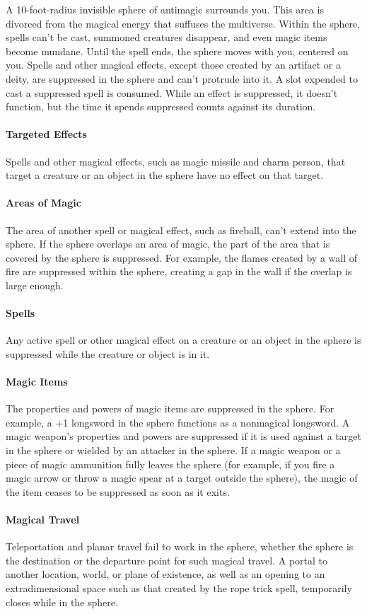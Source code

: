 \documentclass[12pt,showtrims]{memoir}
\begin{document}
\vspace{1\baselineskip}\noindent A 10-foot-radius invisible sphere of antimagic surrounds you. This area is divorced from the magical energy that suffuses the multiverse. Within the sphere, spells can't be cast, summoned creatures disappear, and even magic items become mundane. Until the spell ends, the sphere moves with you, centered on you. Spells and other magical effects, except those created by an artifact or a deity, are suppressed in the sphere and can't protrude into it. A slot expended to cast a suppressed spell is consumed. While an effect is suppressed, it doesn't function, but the time it spends suppressed counts against its duration. \paragraph{Targeted Effects} Spells and other magical effects, such as magic missile and charm person, that target a creature or an object in the sphere have no effect on that target. \paragraph{Areas of Magic} The area of another spell or magical effect, such as fireball, can't extend into the sphere. If the sphere overlaps an area of magic, the part of the area that is covered by the sphere is suppressed. For example, the flames created by a wall of fire are suppressed within the sphere, creating a gap in the wall if the overlap is large enough. \paragraph{Spells} Any active spell or other magical effect on a creature or an object in the sphere is suppressed while the creature or object is in it. \paragraph{Magic Items} The properties and powers of magic items are suppressed in the sphere. For example, a +1 longsword in the sphere functions as a nonmagical longsword. A magic weapon's properties and powers are suppressed if it is used against a target in the sphere or wielded by an attacker in the sphere. If a magic weapon or a piece of magic ammunition fully leaves the sphere (for example, if you fire a magic arrow or throw a magic spear at a target outside the sphere), the magic of the item ceases to be suppressed as soon as it exits. \paragraph{Magical Travel} Teleportation and planar travel fail to work in the sphere, whether the sphere is the destination or the departure point for such magical travel. A portal to another location, world, or plane of existence, as well as an opening to an extradimensional space such as that created by the rope trick spell, temporarily closes while in the sphere. 
\end{document}
